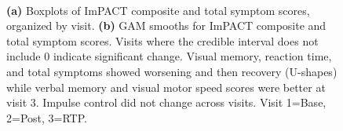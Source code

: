 \documentclass[12pt]{article}
\begin{document}
\begin{figure}[H]
	\\
	\caption{\textbf{(a)} Boxplots of ImPACT composite and total symptom scores, organized by visit. \textbf{(b)} GAM smooths for ImPACT composite and total symptom scores. Visits where the credible interval does not include 0 indicate significant change. Visual memory, reaction time, and total symptoms showed worsening and then recovery (U-shapes) while verbal memory and visual motor speed scores were better at visit 3. Impulse control did not change across visits. Visit 1=Base, 2=Post, 3=RTP.}
	\label{fig:imp-gam}
\end{figure}
\end{document}
